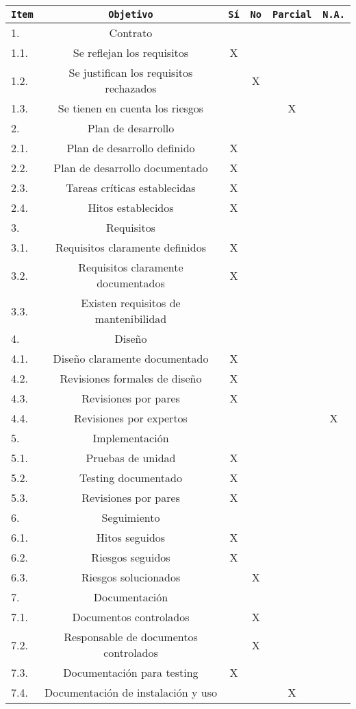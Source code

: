 \begin{center}
\begin{tabular}{|l|c|c|c|c|c|}
\hline
\texttt{Item} & \texttt{Objetivo} & \texttt{S\'i} & \texttt{No} & \texttt{Parcial} &
\texttt{N.A.}\\
\hline
\rowcolor{Gray}
1. & Contrato &&&&\\
\hline
1.1. & Se reflejan los requisitos & X &&&\\
\hline
1.2. & Se justifican los requisitos rechazados && X &&\\
\hline
1.3. & Se tienen en cuenta los riesgos &&& X &\\
\hline
\rowcolor{Gray}
2. & Plan de desarrollo &&&&\\
\hline
2.1. & Plan de desarrollo definido & X &&&\\
\hline
2.2. & Plan de desarrollo documentado & X &&&\\
\hline
2.3. & Tareas cr\'iticas establecidas & X &&&\\
\hline
2.4. & Hitos establecidos & X &&&\\
\hline
\rowcolor{Gray}
3. & Requisitos &&&&\\
\hline
3.1. & Requisitos claramente definidos & X &&&\\
\hline
3.2. & Requisitos claramente documentados & X &&&\\
\hline
3.3. & Existen requisitos de mantenibilidad &&&&\\
\hline
\rowcolor{Gray}
4. & Dise\~no &&&&\\
\hline
4.1. & Dise\~no claramente documentado & X &&&\\
\hline
4.2. & Revisiones formales de dise\~no & X &&&\\
\hline
4.3. & Revisiones por pares & X &&&\\
\hline
4.4. & Revisiones por expertos &&&& X\\ 
\hline
\rowcolor{Gray}
5. & Implementaci\'on &&&&\\
\hline
5.1. & Pruebas de unidad & X &&&\\
\hline
5.2. & Testing documentado & X &&&\\
\hline
5.3. & Revisiones por pares & X &&&\\
\hline
\rowcolor{Gray}
6. & Seguimiento &&&&\\
\hline
6.1. & Hitos seguidos & X &&&\\
\hline
6.2. & Riesgos seguidos & X &&&\\
\hline
6.3. & Riesgos solucionados && X &&\\
\hline
\rowcolor{Gray}
7. & Documentaci\'on &&&&\\
\hline
7.1. & Documentos controlados && X &&\\
\hline
7.2. & Responsable de documentos controlados && X &&\\
\hline
7.3. & Documentaci\'on para testing & X &&&\\
\hline
7.4. & Documentaci\'on de instalaci\'on y uso &&& X &\\
\hline
\end{tabular}
\end{center}

